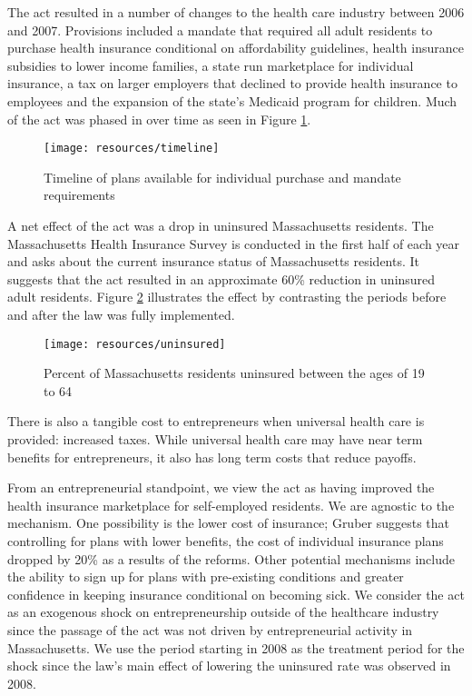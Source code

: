 \documentclass[12pt]{article}
\begin{document}
The act resulted in a number of changes to the health care industry between 2006 and 2007. Provisions included a mandate that required all adult residents to purchase health insurance conditional on affordability guidelines, health insurance subsidies to lower income families, a state run marketplace for individual insurance, a tax on larger employers that declined to provide health insurance to employees and the expansion of the state's Medicaid program for children. Much of the act was phased in over time as seen in Figure \ref{fig:reformTimeline}.

\begin{figure}[H]
	\centering
	\texttt{[image: resources/timeline]}
	\caption{Timeline of plans available for individual purchase and mandate requirements}
	\label{fig:reformTimeline}
\end{figure}

A net effect of the act was a drop in uninsured Massachusetts residents. The Massachusetts Health Insurance Survey is conducted in the first half of each year and asks about the current insurance status of Massachusetts residents. It suggests that the act resulted in an approximate 60\% reduction in uninsured adult residents. Figure \ref{fig:uninsuredRate} illustrates the effect by contrasting the periods before and after the law was fully implemented. 

\begin{figure}[H]
	\centering
	\texttt{[image: resources/uninsured]}
	\caption{Percent of Massachusetts residents uninsured between the ages of 19 to 64}
	\label{fig:uninsuredRate}
\end{figure}

There is also a tangible cost to entrepreneurs when universal health care is provided: increased taxes.  While universal health care may have near term benefits for entrepreneurs, it also has long term costs that reduce payoffs. 

From an entrepreneurial standpoint, we view the act as having improved the health insurance marketplace for self-employed residents. We are agnostic to the mechanism. One possibility is the lower cost of insurance; Gruber \cite{gruber} suggests that controlling for plans with lower benefits, the cost of individual insurance plans dropped by 20\% as a results of the reforms. Other potential mechanisms include the ability to sign up for plans with pre-existing conditions and greater confidence in keeping insurance conditional on becoming sick. We consider the act as an exogenous shock on entrepreneurship outside of the healthcare industry since the passage of the act was not driven by entrepreneurial activity in Massachusetts. We use the period starting in 2008 as the treatment period for the shock since the law's main effect of lowering the uninsured rate was observed in 2008. 
\end{document}
